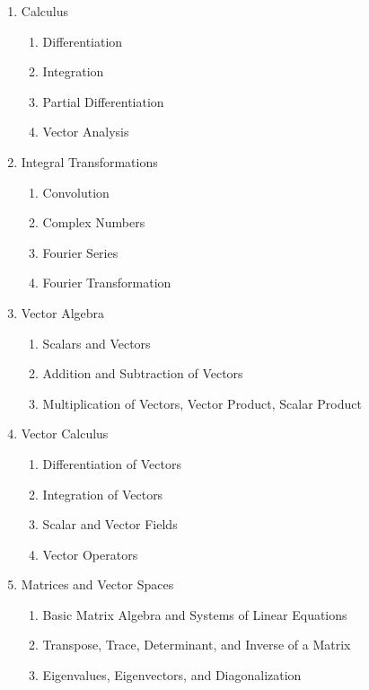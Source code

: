 \documentclass[8pt]{extarticle}
\begin{document}
\begin{enumerate}[label=\arabic*.]
    \item Calculus
          \begin{enumerate}[label*=\arabic*.]
              \item Differentiation
              \item Integration
              \item Partial Differentiation
              \item Vector Analysis
          \end{enumerate}
    \item Integral Transformations
          \begin{enumerate}[label*=\arabic*.]
              \item Convolution
              \item Complex Numbers
              \item Fourier Series
              \item Fourier Transformation
          \end{enumerate}
    \item Vector Algebra
          \begin{enumerate}[label*=\arabic*.]
              \item Scalars and Vectors
              \item Addition and Subtraction of Vectors
              \item Multiplication of Vectors, Vector Product, Scalar Product
          \end{enumerate}
    \item Vector Calculus
          \begin{enumerate}[label*=\arabic*.]
              \item Differentiation of Vectors
              \item Integration of Vectors
              \item Scalar and Vector Fields
              \item Vector Operators
          \end{enumerate}
    \item Matrices and Vector Spaces
          \begin{enumerate}[label*=\arabic*.]
              \item Basic Matrix Algebra and Systems of Linear Equations
              \item Transpose, Trace, Determinant, and Inverse of a Matrix
              \item Eigenvalues, Eigenvectors, and Diagonalization

\end{enumerate}
\end{enumerate}
\end{document}
